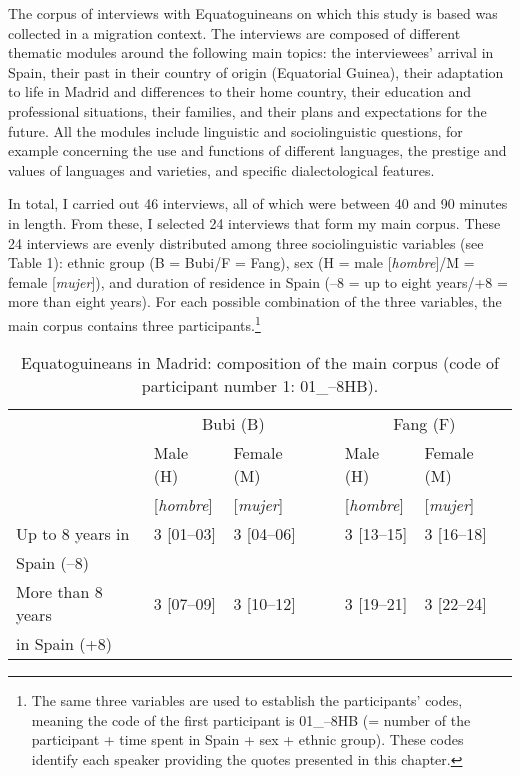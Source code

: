 \documentclass[output=paper]{langscibook}
\begin{document}
The corpus of interviews with Equatoguineans on which this study is based was collected in a migration context. The interviews are composed of different thematic modules around the following main topics: the interviewees’ arrival in Spain, their past in their country of origin (Equatorial Guinea), their adaptation to life in Madrid and differences to their home country, their education and professional situations, their families, and their plans and expectations for the future. All the modules include linguistic and sociolinguistic questions, for example concerning the use and functions of different languages, the prestige and values of languages and varieties, and specific dialectological features.

In total, I carried out 46 interviews, all of which were between 40 and 90 minutes in length. From these, I selected 24 interviews that form my main corpus. These 24 interviews are evenly distributed among three sociolinguistic variables (see Table 1): ethnic group (B = Bubi/F = Fang), sex (H = male [\textit{hombre}]/M = female [\textit{mujer}]), and duration of residence in Spain (–8 = up to eight years/+8 = more than eight years). For each possible combination of the three variables, the main corpus contains three participants.\footnote{The same three variables are used to establish the participants’ codes, meaning the code of the first participant is 01\_–8HB (= number of the participant + time spent in Spain + sex + ethnic group). These codes identify each speaker providing the quotes presented in this chapter.}


\begin{table}[h]
\caption{Equatoguineans in Madrid: composition of the main corpus (code of participant number 1: 01\_–8HB).}
\label{schlumpf:tab:1}
\begin{tabular}{llllll}\midrule\toprule
&\multicolumn{2}{c}{Bubi (B)}                                                                                                                                                                             
&\quad & \multicolumn{2}{c}{Fang (F)}\\[3pt]
& Male (H)  & Female (M) &&Male (H)  & Female (M)\\
&[\textit{hombre}]  & [\textit{mujer}] &&[\textit{hombre}]  & [\textit{mujer}]\\
\midrule
Up to 8 years in&	3 [01–03]	&3 [04–06]&& 3 [13–15]	&3 [16–18]\\
 Spain (–8)&&&&&\\[3pt]
More than 8 years &	3 [07–09]&	3 [10–12]&& 3 [19–21]&	3 [22–24]\\
 in Spain  (+8) &&&&&\\
\bottomrule\midrule
\end{tabular}
\end{table}
\end{document}
